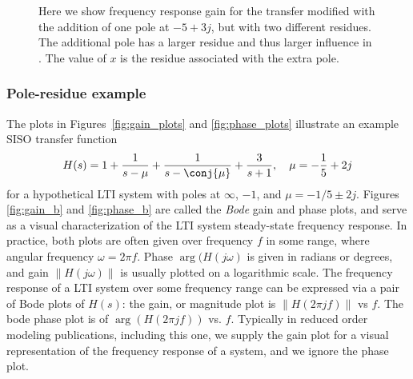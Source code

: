 \begin{figure}[ht]
\centering
{}


\caption{Here we show  frequency response gain for the transfer modified with the addition of one pole at $-5+3j$, but with two different residues.  The additional pole has a larger residue and thus larger  influence in .  The value of $x$ is the residue associated with the  extra pole.}
\label{fig:extra_pole_examples}
\end{figure}


\subsubsection{Pole-residue example}
The plots in Figures~\ref{fig:gain_plots} and \ref{fig:phase_plots} illustrate an example SISO transfer function
\begin{equation}
H(s)=1 + \frac{1}{s-\mu}+\frac{1}{s-\conj{\mu}}+\frac{3}{s+1}, \quad \mu = -\frac{1}{5}+2j
\label{eq:example_tfunc1}
\end{equation}
for a hypothetical LTI system  with poles at $\infty$, $-1$, and $\mu=-1/5 \pm 2j$.   Figures \ref{fig:gain_b} and  \ref{fig:phase_b} are called the \emph{Bode} gain and phase plots, and serve as a visual characterization of the  LTI system steady-state frequency response.  In practice, both plots are often given over frequency $f$ in some range, where angular frequency $\omega = 2\pi f$.   Phase $\arg(H(j \omega)$ is given in radians or degrees, and gain $\| H(j \omega) \|$ is usually plotted on a logarithmic scale.  The frequency response of a LTI system over some frequency range can be expressed via a pair of Bode plots of $H(s)$: the gain, or magnitude plot is $\|H(2\pi j f)\|$ vs $f$.  The bode phase plot is of $\arg(H(2\pi j f))$ vs. $f$.  Typically in reduced order modeling publications, including this one, we supply the gain plot for a visual representation of the frequency response of a system, and we ignore the phase plot.     

